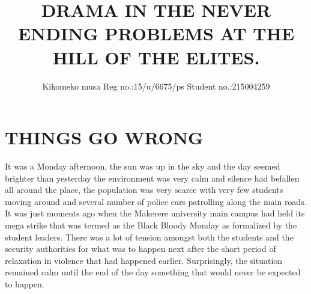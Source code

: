 \documentclass[12pt]{article}
\begin{document}
	\title{DRAMA IN THE NEVER ENDING
		PROBLEMS AT THE HILL OF THE ELITES.}
	\author{Kikomeko musa Reg no.:15/u/6675/ps Student no.:215004259}
	\maketitle
	
	\section{THINGS GO WRONG}
	It was a Monday afternoon, the sun was up in the sky and the day
	seemed brighter than yesterday the environment was very calm and
	silence had befallen all around the place, the population was very
	scarce with very few students moving around and several number of
	police cars patrolling along the main roads.
	It was just moments ago when the Makerere university main campus
	had held its mega strike that was termed as the Black Bloody Monday
	as formalized by the student leaders. There was a lot of tension
	amongst both the students and the security authorities for what was
	to happen next after the short period of relaxation in violence that
	had happened earlier. Surprisingly, the situation remained calm until
	the end of the day something that would never be expected to happen.
\end{document}
